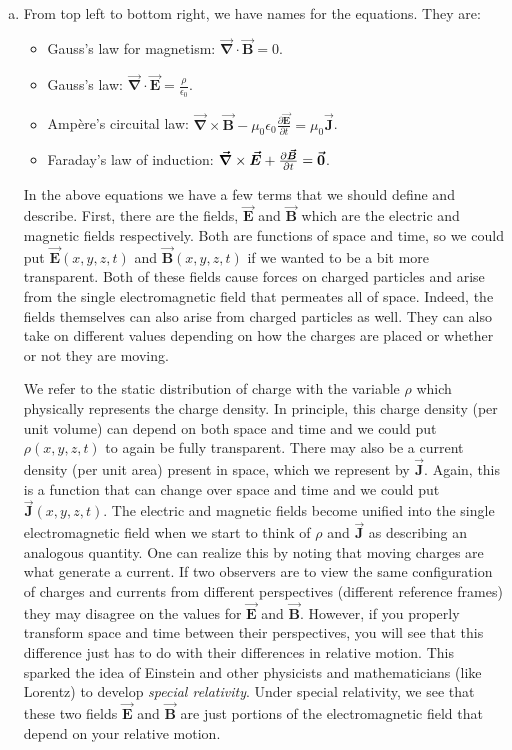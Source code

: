 \documentclass[12pt]{article} %
\newcommand{\grad}{\boldsymbol{\vec{\nabla}}}
\newcommand{\vecfieldE}{\boldsymbol{\vec{E}}}
\newcommand{\vecfieldB}{\boldsymbol{\vec{B}}}
\newcommand{\vecfieldJ}{\boldsymbol{\vec{J}}}
\begin{document}
\begin{solution}~
\begin{enumerate}[(a)]
    \item From top left to bottom right, we have names for the equations.  They are:
    \begin{itemize}
        \item Gauss's law for magnetism: $\grad \cdot \vecfieldB = 0$.
        \item Gauss's law: $\grad \cdot \vecfieldE = \frac{\rho}{\epsilon_0}$.
        \item Amp\`ere's circuital law: $\grad \times \vecfieldB -\mu_0 \epsilon_0\frac{\partial \vecfieldE}{\partial t}=\mu_0 \vecfieldJ$.
        \item Faraday's law of induction: $\grad \times \vecfieldE + \frac{\partial \vecfieldB}{\partial t} = \zerovec$.
    \end{itemize}
    
    In the above equations we have a few terms that we should define and describe.  First, there are the fields, $\vecfieldE$ and $\vecfieldB$ which are the electric and magnetic fields respectively.  Both are functions of space and time, so we could put $\vecfieldE(x,y,z,t)$ and $\vecfieldB(x,y,z,t)$ if we wanted to be a bit more transparent.  Both of these fields cause forces on charged particles and arise from the single electromagnetic field that permeates all of space.  Indeed, the fields themselves can also arise from charged particles as well.  They can also take on different values depending on how the charges are placed or whether or not they are moving.
    
    We refer to the static distribution of charge with the variable $\rho$ which physically represents the charge density.  In principle, this charge density (per unit volume) can depend on both space and time and we could put $\rho(x,y,z,t)$ to again be fully transparent.  There may also be a current density (per unit area) present in space, which we represent by $\vecfieldJ$. Again, this is a function that can change over space and time and we could put $\vecfieldJ(x,y,z,t)$.  The electric and magnetic fields become unified into the single electromagnetic field when we start to think of $\rho$ and $\vecfieldJ$ as describing an analogous quantity. One can realize this by noting that moving charges are what generate a current.  If two observers are to view the same configuration of charges and currents from different perspectives (different reference frames) they may disagree on the values for $\vecfieldE$ and $\vecfieldB$.  However, if you properly transform space and time between their perspectives, you will see that this difference just has to do with their differences in relative motion.  This sparked the idea of Einstein and other physicists and mathematicians (like Lorentz) to develop \emph{special relativity}.  Under special relativity, we see that these two fields $\vecfieldE$ and $\vecfieldB$ are just portions of the electromagnetic field that depend on your relative motion.
    

\end{enumerate}
\end{solution}
\end{document}
